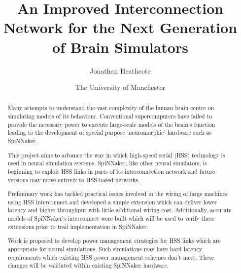 \documentclass[a4paper,12pt,titlepage]{report}
\title{An Improved Interconnection Network for the Next Generation of Brain
Simulators}
\author{Jonathan Heathcote}
\date{The University of Manchester}
\begin{document}
	
	\maketitle
	
	\begin{abstract}
		
		Many attempts to understand the vast complexity of the human brain centre on
		simulating models of its behaviour. Conventional supercomputers have failed
		to provide the necessary power to execute large-scale models of the brain's
		function leading to the development of special purpose `neuromorphic'
		hardware such as SpiNNaker.
		
		This project aims to advance the way in which high-speed serial (HSS)
		technology is used in neural simulation systems. SpiNNaker, like other
		neural simulators, is beginning to exploit HSS links in parts of its
		interconnection network and future versions may move entirely to HSS-based
		networks.
		
		Preliminary work has tackled practical issues involved in the wiring of
		large machines using HSS interconnect and developed a simple extension which
		can deliver lower latency and higher throughput with little additional
		wiring cost. Additionally, accurate models of SpiNNaker's interconnect were
		built which will be used to verify these extensions prior to trail
		implementation in SpiNNaker.
		
		Work is proposed to develop power management strategies for HSS links which
		are appropriate for neural simulations. Such simulations may have hard
		latency requirements which existing HSS power management schemes don't meet.
		These changes will be validated within existing SpiNNaker hardware.
		
	\end{abstract}
	
	\tableofcontents
	\listoffigures
	
	
	
	
	
	
	
	
	
	
\end{document}
